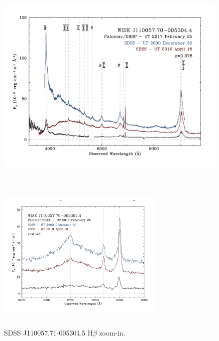 \documentclass{emulateapj}
\begin{document}
\begin{figure}
  \includegraphics[width=17.00cm, height=9.50cm, trim=0.0cm 0.0cm 0.0cm 0.0cm, clip]
  {../plots/w1100m0052_sdss.jpg}
  \centering
  \caption[]{  } 
\label{fig:w1100m0052_sdss}
\end{figure}

\begin{figure}
  \includegraphics[width=8.00cm, height=7.50cm, trim=0.0cm 0.0cm 0.0cm 0.0cm, clip]
  {../plots/w1100m0052_hbeta.jpg}
  \centering
  \caption[]{SDSS J110057.71-005304.5 H$\beta$ zoom-in.}
 \label{fig:w1100m0052_hbeta}
\end{figure}
\end{document}
